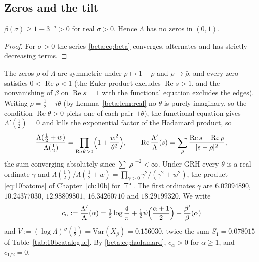 \subsection{Zeros and the tilt}

\begin{lemma}\label{beta:lem:real}
$\beta(\sigma)\ge1-3^{-\sigma}>0$ for real $\sigma>0$. Hence $\Lambda$ has no zeros in $(0,1)$.
\end{lemma}

\begin{proof}
For $\sigma>0$ the series \eqref{beta:eq:beta} converges, alternates and has strictly decreasing terms.
\end{proof}

The zeros $\rho$ of $\Lambda$ are symmetric under $\rho\mapsto1-\rho$ and $\rho\mapsto\bar\rho$, and every zero satisfies $0<\operatorname{Re}\rho<1$ (the Euler product excludes $\operatorname{Re} s>1$, and the nonvanishing of $\beta$ on $\operatorname{Re} s=1$ with the functional equation excludes the edges). Writing $\rho=\tfrac12+i\theta$ (by Lemma~\ref{beta:lem:real} no $\theta$ is purely imaginary, so the condition $\operatorname{Re}\theta>0$ picks one of each pair $\pm\theta$), the functional equation gives $\Lambda'(\tfrac12)=0$ and kills the exponential factor of the Hadamard product, so
\begin{equation}\label{beta:eq:hadamard}
\frac{\Lambda(\tfrac12+w)}{\Lambda(\tfrac12)}=\prod_{\operatorname{Re}\theta>0}\Bigl(1+\frac{w^2}{\theta^2}\Bigr),
\qquad
\operatorname{Re}\frac{\Lambda'}{\Lambda}(s)=\sum_{\rho}\frac{\operatorname{Re} s-\operatorname{Re}\rho}{|s-\rho|^2},
\end{equation}
the sum converging absolutely since $\sum|\rho|^{-2}<\infty$. Under GRH every $\theta$ is a real ordinate $\gamma$ and $\Lambda(\tfrac12)/\Lambda(\tfrac12+w)=\prod_{\gamma>0}\gamma^2/(\gamma^2+w^2)$, the product \eqref{eq:10batoms} of Chapter~\ref{ch:10b} for $\Xi^{\mathrm{sd}}$. The first ordinates $\gamma$ are $6.02094890$, $10.24377030$, $12.98809801$, $16.34260710$ and $18.29199320$. We write
\begin{equation}\label{beta:eq:calpha}
c_\alpha:=\frac{\Lambda'}{\Lambda}(\alpha)=\tfrac12\log\frac4\pi+\tfrac12\psi\Bigl(\frac{\alpha+1}{2}\Bigr)+\frac{\beta'}{\beta}(\alpha)
\end{equation}
and $V:=(\log\Lambda)''(\tfrac12)=\mathrm{Var}(X_\beta)=0.156030$, twice the sum $S_1=0.078015$ of Table~\ref{tab:10bcatalogue}. By \eqref{beta:eq:hadamard}, $c_\alpha>0$ for $\alpha\ge1$, and $c_{1/2}=0$.


